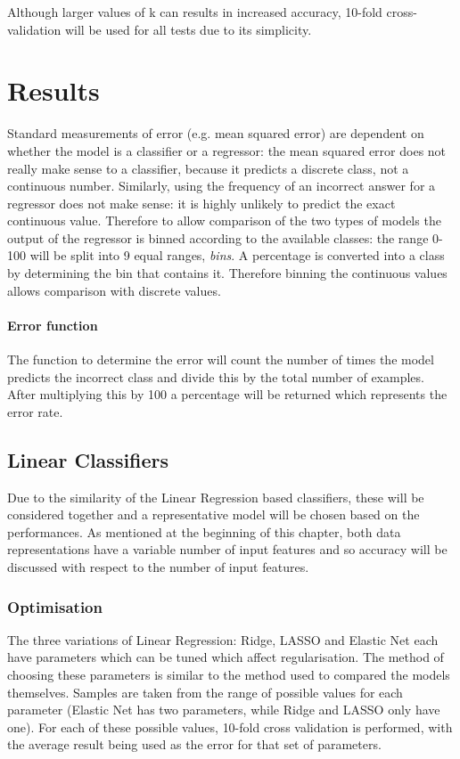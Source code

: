 Although larger values of k can results in increased accuracy\cite{ArlotCelisse}, 10-fold cross-validation will be used for all tests due to its simplicity.


\section{Results}
Standard measurements of error (e.g. mean squared error) are dependent on whether the model is a classifier or a regressor: the mean squared error does not really make sense to a classifier, because it predicts a discrete class, not a continuous number. Similarly, using the frequency of an incorrect answer for a regressor does not make sense: it is highly unlikely to predict the exact continuous value. Therefore to allow comparison of the two types of models the output of the regressor is binned according to the available classes: the range 0-100 will be split into 9 equal ranges, {\it bins}. A percentage is converted into a class by determining the bin that contains it. Therefore binning the continuous values allows comparison with discrete values.
\paragraph*{Error function}
The function to determine the error will count the number of times the model predicts the incorrect class and divide this by the total number of examples. After multiplying this by 100 a percentage will be returned which represents the error rate.

\subsection{Linear Classifiers}
Due to the similarity of the Linear Regression based classifiers, these will be considered together and a representative model will be chosen based on the performances. As mentioned at the beginning of this chapter, both data representations have a variable number of input features and so accuracy will be discussed with respect to the number of input features.

\subsubsection{Optimisation}
The three variations of Linear Regression: Ridge, LASSO and Elastic Net each have parameters which can be tuned which affect regularisation. The method of choosing these parameters is similar to the method used to compared the models themselves.
Samples are taken from the range of possible values for each parameter (Elastic Net has two parameters, while Ridge and LASSO only have one). For each of these possible values, 10-fold cross validation is performed, with the average result being used as the error for that set of parameters.

